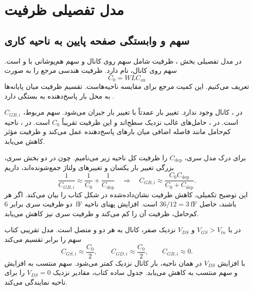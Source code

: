 \section{مدل تفصیلی ظرفیت }
\subsection{سهم  و وابستگی صفحه پایین به ناحیه کاری}
در مدل تفصیلی بخش ، ظرفیت  شامل سهم روی کانال و سهم
هم‌پوشانی با  و  است. سهم روی کانال، 
نام دارد. ظرفیت هندسی مرجع را به صورت
\begin{equation}
 C_0=WLC_{\mathrm{ox}}
 \label{eq:cv-czero}
\end{equation}
تعریف می‌کنیم. این کمیت مرجع برای مقایسه ناحیه‌هاست. تقسیم ظرفیت میان پایانه‌ها
به محل بار پاسخ‌دهنده به  بستگی دارد
\cite[صفحه ۷۰، شکل ]{weste}.

در ، کانال  وجود ندارد. تغییر بار 
عمدتاً با تغییر بار  جبران می‌شود. سهم مربوط، \(C_{GB,i}\) است.
در ، حامل‌های غالب نزدیک سطح‌اند و این ظرفیت تقریباً
\(C_0\) است. در ، ناحیه کم‌حامل مانند فاصله اضافی میان بارهای
پاسخ‌دهنده عمل می‌کند و ظرفیت مؤثر کاهش می‌یابد.

برای درک مدل سری، \(C_{\mathrm{dep}}\) را ظرفیت کل ناحیه 
زیر  می‌نامیم. چون در دو بخش سری، بزرگی تغییر بار یکسان و تغییرهای
ولتاژ جمع‌شونده‌اند، داریم
\begin{equation}
 \frac1{C_{GB,i}}\approx\frac1{C_0}+\frac1{C_{\mathrm{dep}}}
 \quad\Longrightarrow\quad
 C_{GB,i}\approx\frac{C_0C_{\mathrm{dep}}}{C_0+C_{\mathrm{dep}}}.
 \label{eq:cv-depletion-series}
\end{equation}
این توضیح تکمیلی، کاهش ظرفیت نشان‌داده‌شده در شکل  کتاب را بیان
می‌کند. اگر هر دو ظرفیت سری برابر \qty{6}{\femto\farad} باشند، حاصل
\(36/12=\qty{3}{\femto\farad}\) است.
افزایش پهنای ناحیه کم‌حامل، ظرفیت آن را کم می‌کند و ظرفیت سری نیز کاهش می‌یابد.

در  با \(V_{GS}>V_{tn}\) و \(V_{DS}\) نزدیک صفر، کانال به هر دو
 و  متصل است. مدل تقریبی کتاب سهم را برابر تقسیم می‌کند
\begin{equation}
 C_{GS,i}\approx\frac{C_0}{2},\qquad
 C_{GD,i}\approx\frac{C_0}{2},\qquad C_{GB,i}\approx0.
 \label{eq:cv-linear-partition}
\end{equation}
با افزایش \(V_{DS}\) در همان ناحیه، بار کانال نزدیک  کمتر می‌شود.
سهم منتسب به  افزایش و سهم منتسب به  کاهش می‌یابد.
جدول ساده کتاب، مقادیر نزدیک \(V_{DS}=0\) را برای ناحیه  نمایندگی می‌کند.

